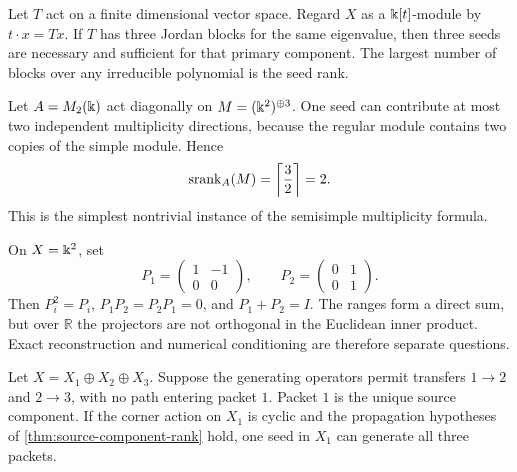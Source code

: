 \begin{microexample}[title={R1: one operator with several primary blocks}]
Let \(T\) act on a finite dimensional vector space.  Regard \(X\) as a \(\Bbbk[t]\)-module by \(t\cdot x=Tx\).  If \(T\) has three Jordan blocks for the same eigenvalue, then three seeds are necessary and sufficient for that primary component.  The largest number of blocks over any irreducible polynomial is the seed rank.
\end{microexample}

\begin{microexample}[title={R2: a matrix algebra with multiplicity}]
Let \(A=M_2(\Bbbk)\) act diagonally on \(M=(\Bbbk^2)^{\oplus3}\).  One seed can contribute at most two independent multiplicity directions, because the regular module contains two copies of the simple module.  Hence
\[
\operatorname{srank}_A(M)=\left\lceil\frac{3}{2}\right\rceil=2.
\]
This is the simplest nontrivial instance of the semisimple multiplicity formula.
\end{microexample}

\begin{microexample}[title={R3: an exact but oblique packet split}]
On \(X=\Bbbk^2\), set
\[
P_1=\begin{pmatrix}1&-1\\0&0\end{pmatrix},
\qquad
P_2=\begin{pmatrix}0&1\\0&1\end{pmatrix}.
\]
Then \(P_i^2=P_i\), \(P_1P_2=P_2P_1=0\), and \(P_1+P_2=I\).  The ranges form a direct sum, but over \(\mathbb R\) the projectors are not orthogonal in the Euclidean inner product.  Exact reconstruction and numerical conditioning are therefore separate questions.
\end{microexample}

\begin{microexample}[title={R4: a directed packet system}]
Let \(X=X_1\oplus X_2\oplus X_3\).  Suppose the generating operators permit transfers \(1\to2\) and \(2\to3\), with no path entering packet \(1\).  Packet \(1\) is the unique source component.  If the corner action on \(X_1\) is cyclic and the propagation hypotheses of \cref{thm:source-component-rank} hold, one seed in \(X_1\) can generate all three packets.
\end{microexample}

